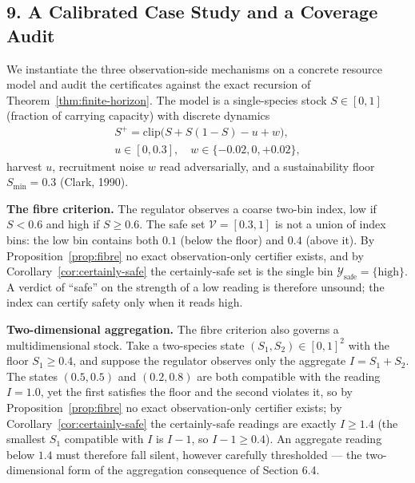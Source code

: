 \documentclass[10pt,twocolumn]{article}
\theoremstyle{definition}
\begin{document}
\subsection{9. A Calibrated Case Study and a Coverage Audit}\label{case-study}

We instantiate the three observation-side mechanisms on a concrete resource model and audit the certificates against the exact recursion of Theorem~\ref{thm:finite-horizon}. The model is a single-species stock \(S \in [0,1]\) (fraction of carrying capacity) with discrete dynamics
\[
\begin{gathered}
S^{+} = \mathrm{clip}\bigl(S + S(1-S) - u + w\bigr),\\
u \in [0, 0.3],\quad w \in \{-0.02, 0, +0.02\},
\end{gathered}
\]
harvest \(u\), recruitment noise \(w\) read adversarially, and a sustainability floor \(S_{\min} = 0.3\) (Clark, 1990).

\textbf{The fibre criterion.} The regulator observes a coarse two-bin index, low if \(S < 0.6\) and high if \(S \ge 0.6\). The safe set \(\mathcal{V} = [0.3, 1]\) is not a union of index bins: the low bin contains both \(0.1\) (below the floor) and \(0.4\) (above it). By Proposition~\ref{prop:fibre} no exact observation-only certifier exists, and by Corollary~\ref{cor:certainly-safe} the certainly-safe set is the single bin \(\mathcal{Y}_{\mathrm{safe}} = \{\text{high}\}\). A verdict of ``safe'' on the strength of a low reading is therefore unsound; the index can certify safety only when it reads high.

\textbf{Two-dimensional aggregation.} The fibre criterion also governs a multidimensional stock. Take a two-species state \((S_{1}, S_{2}) \in [0,1]^{2}\) with the floor \(S_{1} \ge 0.4\), and suppose the regulator observes only the aggregate \(I = S_{1} + S_{2}\). The states \((0.5, 0.5)\) and \((0.2, 0.8)\) are both compatible with the reading \(I = 1.0\), yet the first satisfies the floor and the second violates it, so by Proposition~\ref{prop:fibre} no exact observation-only certifier exists; by Corollary~\ref{cor:certainly-safe} the certainly-safe readings are exactly \(I \ge 1.4\) (the smallest \(S_{1}\) compatible with \(I\) is \(I - 1\), so \(I - 1 \ge 0.4\)). An aggregate reading below \(1.4\) must therefore fall silent, however carefully thresholded --- the two-dimensional form of the aggregation consequence of Section 6.4.
\end{document}
